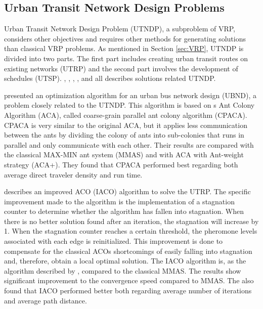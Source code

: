\subsection{Urban Transit Network Design Problems}
\label{subsec:relatedWorkUTNDP}

Urban Transit Network Design Problem (UTNDP), a subproblem of VRP, considers other objectives and requires other methods for generating solutions than classical VRP problems. As mentioned in Section \vref{sec:VRP}, UTNDP is divided into two parts. The first part includes creating urban transit routes on existing networks (UTRP) and the second part involves the development of schedules (UTSP). \citet{yang07}, \citet{jiang10}, \citet{poorzahedy11}, \citet{nikolic14}, and \citet{kechagiopoulos14} all describes solutions related UTNDP. %

\citet{yang07} presented an optimization algorithm for an urban bus network design (UBND), a problem closely related to the UTNDP. This algorithm is based on \citet{dorigo96}s Ant Colony Algorithm (ACA), called coarse-grain parallel ant colony algorithm (CPACA). CPACA is very similar to the original ACA, but it applies less communication between the ants by dividing the colony of ants into sub-colonies that runs in parallel and only communicate with each other. Their results are compared with the classical MAX-MIN ant system (MMAS) \citep{stutzle99} and with ACA with Ant-weight strategy (ACA+). They found that CPACA performed best regarding both average direct traveler density and run time. 

\citet{jiang10} describes an improved ACO (IACO) algorithm to solve the UTRP. The specific improvement made to the algorithm is the implementation of a stagnation counter to determine whether the algorithm has fallen into stagnation. When there is no better solution found after an iteration, the stagnation will increase by 1. When the stagnation counter reaches a certain threshold, the pheromone levels associated with each edge is reinitialized. This improvement is done to compensate for the classical ACOs shortcomings of easily falling into stagnation and, therefore, obtain a local optimal solution. The IACO algorithm is, as the algorithm described by \citet{yang07}, compared to the classical MMAS. The results show significant improvement to the convergence speed compared to MMAS. The also found that IACO performed better both regarding average number of iterations and average path distance. 

